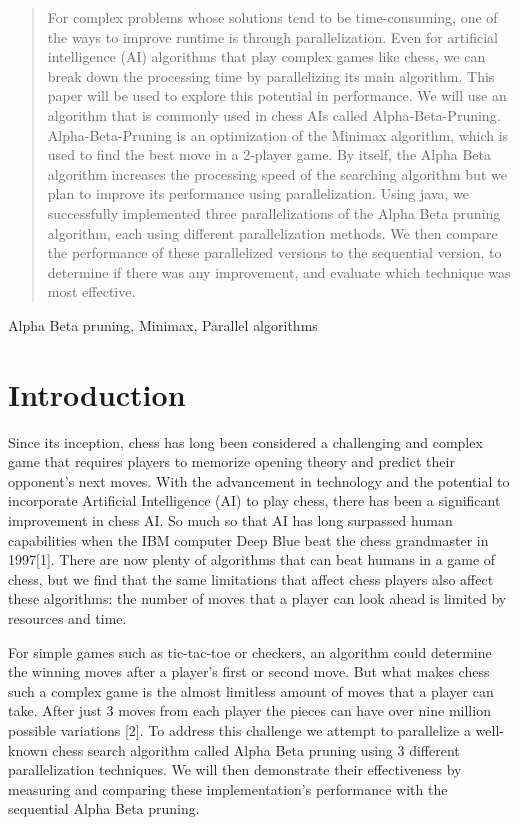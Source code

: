 \documentclass[conference, 11pt]{IEEEtran}
\begin{document}
\begin{abstract}
For complex problems whose solutions tend to be time-consuming, one of the ways to improve runtime is through parallelization. Even for artificial intelligence (AI) algorithms that play complex games like chess, we can break down the processing time by parallelizing its main algorithm. This paper will be used to explore this potential in performance. We will use an algorithm that is commonly used in chess AIs called Alpha-Beta-Pruning. Alpha-Beta-Pruning is an optimization of the Minimax algorithm, which is used to find the best move in a 2-player game. By itself, the Alpha Beta algorithm increases the processing speed of the searching algorithm but we plan to improve its performance using parallelization. Using java, we successfully implemented three parallelizations of the Alpha Beta pruning algorithm, each using different parallelization methods. We then compare the performance of these parallelized versions to the sequential version, to determine if there was any improvement, and evaluate which technique was most effective. 
\end{abstract}

\begin{IEEEkeywords}
Alpha Beta pruning, Minimax, Parallel algorithms
\end{IEEEkeywords}

\section{Introduction}
Since its inception, chess has long been considered a challenging and complex game that requires players to memorize opening theory and predict their opponent's next moves. With the advancement in technology and the potential to incorporate Artificial Intelligence (AI) to play chess, there has been a significant improvement in chess AI. So much so that AI has long surpassed human capabilities when the IBM computer Deep Blue beat the chess grandmaster in 1997[1]. There are now plenty of algorithms that can beat humans in a game of chess, but we find that the same limitations that affect chess players also affect these algorithms: the number of moves that a player can look ahead is limited by resources and time.\vspace{10pt}

For simple games such as tic-tac-toe or checkers, an algorithm could determine the winning moves after a player's first or second move. But what makes chess such a complex game is the almost limitless amount of moves that a player can take. After just 3 moves from each player the pieces can have over nine million possible variations [2]. To address this challenge we attempt to parallelize a well-known chess search algorithm called Alpha Beta pruning using 3 different parallelization techniques. We will then demonstrate their effectiveness by measuring and comparing these implementation’s performance with the sequential Alpha Beta pruning.
\end{document}
